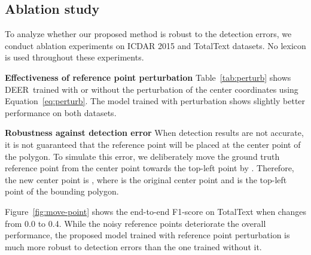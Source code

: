 \documentclass[10pt,twocolumn,letterpaper]{article}
\newcommand{\Figure}[1]{Figure~\ref{fig:#1}}
\newcommand{\Table}[1]{Table~\ref{tab:#1}}
\newcommand{\Equation}[1]{Equation~\ref{eq:#1}}
\newcommand{\methodname}[0]{DEER}
\begin{document}
\begin{table}
\centering
{} \caption{
\textbf{Detection Supervision} -- Training the model to detect text instances is beneficial for the recognition of the text sequences.
} \label{tab:detect}
\end{table}





\subsection{Ablation study}

To analyze whether our proposed method is robust to the detection errors, we conduct ablation experiments on ICDAR 2015 and TotalText datasets. 
No lexicon is used throughout these experiments. 






\noindent\textbf{Effectiveness of reference point perturbation} 
\Table{perturb} shows \methodname~trained with or without the perturbation of the center coordinates  using \Equation{perturb}. The model trained with perturbation shows slightly better performance on both datasets.

\noindent\textbf{Robustness against detection error}
When detection results are not accurate, it is not guaranteed that the reference point  will be placed at the center point of the polygon. To simulate this error, we deliberately move the ground truth reference point from the center point towards the top-left point by . Therefore, the new center point is , where  is the original center point and  is the top-left point of the bounding polygon.



\Figure{move-point} shows the end-to-end F1-score on TotalText when  changes from 0.0 to 0.4. While the noisy reference points deteriorate the overall performance, the proposed model trained with reference point perturbation is much more robust to detection errors than the one trained without it.
\end{document}
